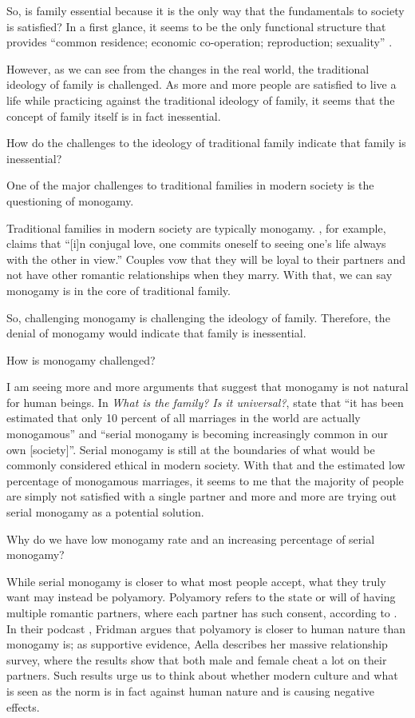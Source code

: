 \documentclass[12pt]{article}
\begin{document}
So, is family essential because it is the only way that the fundamentals to
society is satisfied?
In a first glance, it seems to be the only functional structure that provides
``common residence; economic co-operation; reproduction; sexuality''
\citep[p. 60]{gittins1993family}.

However, as we can see from the changes in the real world,
the traditional ideology of family is challenged.
As more and more people are satisfied to live a life while
practicing against the traditional ideology of family,
it seems that the concept of family itself is in fact inessential.

How do the challenges to the ideology of traditional family indicate that
family is inessential?

One of the major challenges to traditional families
in modern society is the questioning of monogamy.

Traditional families in modern society are typically monogamy.
\citet[pp. 4]{schwitzgebel2008thoughts}, for example, claims that
``[i]n conjugal love,
one commits oneself to seeing one's life always with the other in view.''
Couples vow that they will be loyal to their partners and not have other
romantic relationships when they marry.
With that, we can say monogamy is in the core of traditional family.

So, challenging monogamy is challenging the ideology of family.
Therefore, the denial of monogamy would indicate that family is inessential.

How is monogamy challenged?

I am seeing more and more arguments that suggest that monogamy is not natural
for human beings.
In \textit{What is the family? Is it universal?},
\citet[p. 63]{gittins1993family} state that
``it has been estimated that only 10 percent of all
marriages in the world are actually monogamous'' and
``serial monogamy is becoming increasingly common in our own [society]''.
Serial monogamy is still at the boundaries of what would be commonly considered
ethical in modern society.
With that and the estimated low percentage of monogamous marriages,
it seems to me that the majority of people are simply not satisfied with a
single partner and
more and more are trying out serial monogamy as a potential solution.

Why do we have low monogamy rate and an increasing percentage of serial
monogamy?

While serial monogamy is closer to what most people accept,
what they truly want may instead be polyamory.
Polyamory refers to the state or will of having multiple romantic partners,
where each partner has such consent, according to \cite{wikipedia2023polyamory}.
In their podcast \citep{fridman2023aella},
Fridman argues that polyamory is closer to human nature than monogamy is;
as supportive evidence, Aella describes her massive relationship survey,
where the results show that both male and female cheat a lot on their partners.
Such results urge us to think about whether modern culture and what is seen as
the norm is in fact against human nature and is causing negative effects.
\end{document}
